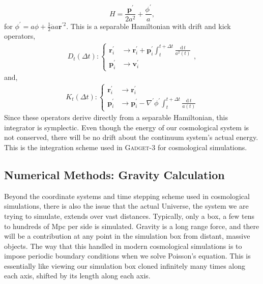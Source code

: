 \begin{equation}
H = \frac{\textbf{p}^\prime}{2 a^2} + \frac{\phi^\prime}{a},
\end{equation}
for $\phi^\prime = a \phi + \frac{1}{2} \ddot{a} a \textbf{r}^{\prime 2}$. This is a separable Hamiltonian with drift and kick operators,
\begin{eqnarray}
D_t(\Delta t) : \begin{cases} 
	  \textbf{r}^\prime_i & \longrightarrow  \textbf{r}^\prime_i + \textbf{p}^\prime_i \int_{t}^{t + \Delta t} \frac{\text{d}\,t}{a^2(t)}\\
      \textbf{p}^\prime_i & \longrightarrow  \textbf{v}^\prime_i 
   \end{cases},
\end{eqnarray}
and,
\begin{eqnarray}
K_t(\Delta t) : \begin{cases} 
	  \textbf{r}^\prime_i & \longrightarrow  \textbf{r}^\prime_i\\
      \textbf{p}^\prime_i & \longrightarrow  \textbf{p}^\prime_i - \nabla^\prime\phi^\prime \int_{t}^{t + \Delta t} \frac{\text{d}\,t}{a(t)}
      \end{cases}
\end{eqnarray}
Since these operators derive directly from a separable Hamiltonian, this integrator is symplectic. Even though the energy of our cosmological system is not conserved, there will be no drift about the continuum system's actual energy. This is the integration scheme used in \textsc{Gadget-3} for cosmological simulations.

\subsection{Numerical Methods: Gravity Calculation}

Beyond the coordinate systems and time stepping scheme used in cosmological simulations, there is also the issue that the actual Universe, the system we are trying to simulate, extends over vast distances. Typically, only a box, a few tens to hundreds of Mpc per side is simulated. Gravity is a long range force, and there will be a contribution at any point in the simulation box from distant, massive objects. The way that this handled in modern cosmological simulations is to impose periodic boundary conditions when we solve Poisson's equation. This is essentially like viewing our simulation box cloned infinitely many times along each axis, shifted by its length along each axis.

